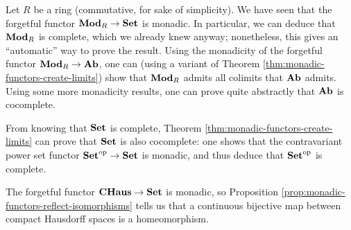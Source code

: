 \begin{example}
	Let \(R\) be a ring (commutative, for sake of simplicity). We have seen that the forgetful functor \(\mathbf{Mod}_R\to\mathbf{Set}\) is monadic. In particular, we can deduce that \(\mathbf{Mod}_R\) is complete,
	which we already knew anyway; nonetheless, this gives an ``automatic'' way to prove the result. Using the monadicity of the forgetful functor \(\mathbf{Mod}_R\to\mathbf{Ab}\), one can (using a variant of
	Theorem \ref{thm:monadic-functors-create-limits}) show that \(\mathbf{Mod}_R\) admits all colimits that \(\mathbf{Ab}\) admits. Using some more monadicity results, one can prove quite abstractly that \(\mathbf{Ab}\)
	is cocomplete.
\end{example}
\begin{example}
	From knowing that \(\mathbf{Set}\) is complete, Theorem \ref{thm:monadic-functors-create-limits} can prove that \(\mathbf{Set}\) is also cocomplete: one shows that the contravariant power set
	functor \(\mathbf{Set}^{\mathrm{op}}\to\mathbf{Set}\) is monadic, and thus deduce that \(\mathbf{Set}^{\mathrm{op}}\) is complete.
\end{example}
\begin{example}
	The forgetful functor \(\mathbf{CHaus}\to\mathbf{Set}\) is monadic, so Proposition \ref{prop:monadic-functors-reflect-isomorphisms} tells us that a continuous bijective map
	between compact Hausdorff spaces is a homeomorphism.
\end{example}


